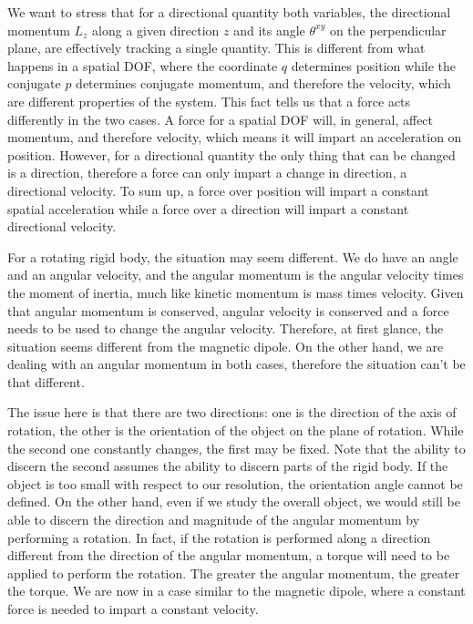 We want to stress that for a directional quantity both variables, the directional momentum $L_z$ along a given direction $z$ and its angle $\theta^{xy}$ on the perpendicular plane, are effectively tracking a single quantity. This is different from what happens in a spatial DOF, where the coordinate $q$ determines position while the conjugate $p$ determines conjugate momentum, and therefore the velocity, which are different properties of the system. This fact tells us that a force acts differently in the two cases. A force for a spatial DOF will, in general, affect momentum, and therefore velocity, which means it will impart an acceleration on position. However, for a directional quantity the only thing that can be changed is a direction, therefore a force can only impart a change in direction, a directional velocity. To sum up, a force over position will impart a constant spatial acceleration while a force over a direction will impart a constant directional velocity.

For a rotating rigid body, the situation may seem different. We do have an angle and an angular velocity, and the angular momentum is the angular velocity times the moment of inertia, much like kinetic momentum is mass times velocity. Given that angular momentum is conserved, angular velocity is conserved and a force needs to be used to change the angular velocity. Therefore, at first glance, the situation seems different from the magnetic dipole. On the other hand, we are dealing with an angular momentum in both cases, therefore the situation can't be that different.

The issue here is that there are two directions: one is the direction of the axis of rotation, the other is the orientation of the object on the plane of rotation. While the second one constantly changes, the first may be fixed. Note that the ability to discern the second assumes the ability to discern parts of the rigid body. If the object is too small with respect to our resolution, the orientation angle cannot be defined. On the other hand, even if we study the overall object, we would still be able to discern the direction and magnitude of the angular momentum by performing a rotation. In fact, if the rotation is performed along a direction different from the direction of the angular momentum, a torque will need to be applied to perform the rotation. The greater the angular momentum, the greater the torque. We are now in a case similar to the magnetic dipole, where a constant force is needed to impart a constant velocity.

